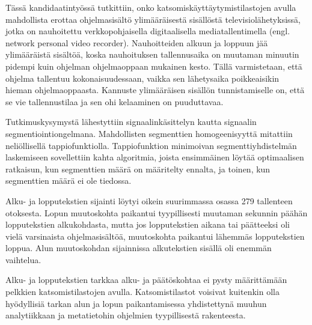 \begin{fiabstract}


Tässä kandidaatintyössä tutkittiin, onko katsomiskäyttäytymistilastojen avulla mahdollista erottaa ohjelmasisältö ylimääräisestä sisällöstä televisiolähetyksissä, jotka on nauhoitettu verkkopohjaisella digitaalisella mediatallentimella (engl. network personal video recorder). Nauhoitteiden alkuun ja loppuun jää ylimääräistä sisältöä, koska nauhoituksen tallennusaika on muutaman minuutin pidempi kuin ohjelman ohjelmaoppaan mukainen kesto. Tällä varmistetaan, että ohjelma tallentuu kokonaisuudessaan, vaikka sen lähetysaika poikkeaisikin hieman ohjelmaoppaasta.
Kannuste ylimääräisen sisällön tunnistamiselle on, että se vie tallennustilaa ja sen ohi kelaaminen on puuduttavaa.

Tutkimuskysymystä lähestyttiin signaalinkäsittelyn kautta signaalin segmentiointiongelmana. Mahdollisten segmenttien homogeenisyyttä mitattiin neliöllisellä tappiofunktiolla. 
Tappiofunktion minimoivan segmenttiyhdistelmän laskemiseen sovellettiin kahta algoritmia, joista ensimmäinen löytää optimaalisen ratkaisun, kun segmenttien määrä on määritelty ennalta, ja toinen, kun segmenttien määrä ei ole tiedossa.

Alku- ja lopputekstien sijainti löytyi oikein suurimmassa osassa 279 tallenteen otoksesta. Lopun muutoskohta paikantui tyypillisesti muutaman sekunnin päähän lopputekstien alkukohdasta, mutta jos lopputekstien aikana tai päätteeksi oli vielä varsinaista ohjelmasisältöä, muutoskohta paikantui lähemmäs lopputekstien loppua. Alun muutoskohdan sijainnissa alkutekstien sisällä oli enemmän vaihtelua.

Alku- ja lopputekstien tarkkaa alku- ja päätöskohtaa ei pysty määrittämään pelkkien katsomistilastojen avulla. Katsomistilastot voisivat kuitenkin olla hyödyllisiä tarkan alun ja lopun paikantamisessa yhdistettynä muuhun analytiikkaan ja metatietohin ohjelmien tyypillisestä rakenteesta.

\end{fiabstract}

